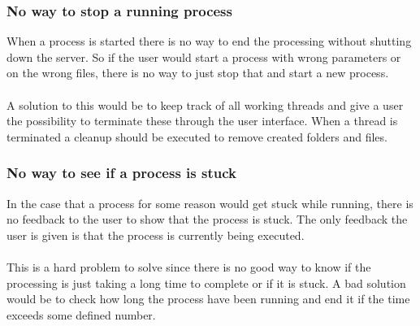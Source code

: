 \subsubsection{No way to stop a running process}
When a process is started there is no way to end the processing without shutting down the server. So if the user would start a process with wrong parameters or on the wrong files, there is no way to just stop that and start a new process.\\
\\
A solution to this would be to keep track of all working threads and give a user the possibility to terminate these through the user interface. When a thread is terminated a cleanup should be executed to remove created folders and files.
\subsubsection{No way to see if a process is stuck}
In the case that a process for some reason would get stuck while running, there is no feedback to the user to show that the process is stuck. The only feedback the user is given is that the process is currently being executed.\\
\\
This is a hard problem to solve since there is no good way to know if the processing is just taking a long time to complete or if it is stuck. A bad solution would be to check how long the process have been running and end it if the time exceeds some defined number.
